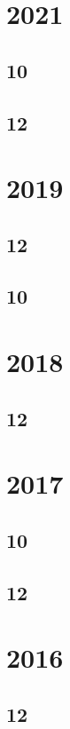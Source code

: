 \documentclass[11pt]{book}
\begin{document}
\section{2021}
\subsection{10}

\subsection{12}

\section{2019}
\subsection{12}


\subsection{10}

\section{2018}
\subsection{12}
  
 

\section{2017}
\subsection{10}

\subsection{12}






\section{2016}
\subsection{12}

\end{document}
